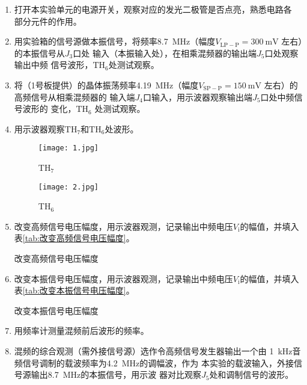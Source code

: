 \documentclass[../main]{subfiles}
\begin{document}
\begin{enumerate}

	\item 打开本实验单元的电源开关，观察对应的发光二极管是否点亮，熟悉电路各
		部分元件的作用。

	\item 用实验箱的信号源做本振信号，将频率\SI{8.7}{\MHz}（幅度$
		V_\mathrm{LP-P} = \SI{300}{\mV} $ 左右）的本振信号从$ J_3 $口处
		输入（本振输入处），在相乘混频器的输出端$ J_5 $口处观察输出中频
		信号波形，$ \mathrm{TH}_6 $处测试观察。

	\item 将（1号板提供）的晶体振荡频率\SI{4.19}{\MHz}（幅度$
		V_\mathrm{SP-P} = \SI{150}{\mV} $ 左右）的高频信号从相乘混频器的
		输入端$ J_4 $口输入，用示波器观察输出端$ J_5 $口处中频信号波形的
		变化，$ \mathrm{TH}_6 $ 处测试观察。

	\item 用示波器观察$ \mathrm{TH}_7 $和$ \mathrm{TH}_6 $处波形。

		\begin{figure}[htbp]
			\centering
			\texttt{[image: 1.jpg]}
			\caption{TH$ _7 $}
			\label{fig:TH7}
		\end{figure}

		\begin{figure}[htbp]
			\centering
			\texttt{[image: 2.jpg]}
			\caption{TH$ _6 $}
			\label{fig:TH6}
		\end{figure}

	\item 改变高频信号电压幅度，用示波器观测，记录输出中频电压$ V_\mathrm{i}
		$的幅值，并填入表\ref{tab:改变高频信号电压幅度}。

		\begin{table}[htbp]
			\centering
			\caption{改变高频信号电压幅度}
			\label{tab:改变高频信号电压幅度}
		\end{table}

	\item 改变本振信号电压幅度，用示波器观测，记录输出中频电压$ V_\mathrm{i}
		$的幅值，并填入表\ref{tab:改变本振信号电压幅度}。

		\begin{table}[htbp]
			\centering
			\caption{改变本振信号电压幅度}
			\label{tab:改变本振信号电压幅度}
		\end{table}

	\item 用频率计测量混频前后波形的频率。

	\item 混频的综合观测（需外接信号源）选作令高频信号发生器输出一个由
		\SI{1}{\kHz}音频信号调制的载波频率为\SI{4.2}{\MHz}的调幅波，作为
		本实验的载波输入，外接信号源输出\SI{8.7}{\MHz}的本振信号，用示波
		器对比观察$ J_5 $处和调制信号的波形。

\end{enumerate}
\end{document}
